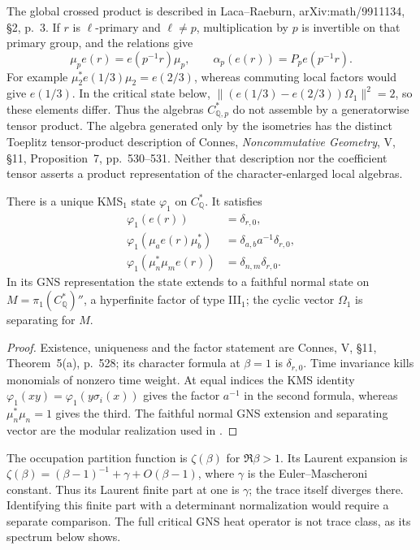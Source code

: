 \begin{remark}
\label{v4-arith:w5-b:rem:wave4-ref}
The global crossed product is described in Laca--Raeburn,
arXiv:math/9911134, \S2, p.~3. If $r$ is $\ell$-primary and
$\ell\ne p$, multiplication by $p$ is invertible on that primary
group, and the relations give
\[
 \mu_p e(r)=e(p^{-1}r)\mu_p,\qquad
 \alpha_p(e(r))=P_p e(p^{-1}r).
\]
For example $\mu_2^*e(1/3)\mu_2=e(2/3)$, whereas commuting local
factors would give $e(1/3)$. In the critical state below,
$\|(e(1/3)-e(2/3))\Omega_1\|^2=2$, so these elements differ.
Thus the algebras $C^*_{\mathbb Q,p}$ do not assemble by a
generatorwise tensor product. The algebra generated only by the
isometries has the distinct Toeplitz tensor-product description of
Connes, \emph{Noncommutative Geometry}, V, \S11, Proposition~7,
pp.~530--531. Neither that description nor the coefficient tensor
asserts a product representation of the character-enlarged local
algebras.
\end{remark}

\begin{lemma}
\label{v4-arith:w5-b:lem:kms-1}
There is a unique KMS$_1$ state $\varphi_1$ on $C^*_{\mathbb Q}$.
It satisfies
\[
 \begin{aligned}
 \varphi_1(e(r))&=\delta_{r,0},\\
 \varphi_1(\mu_a e(r)\mu_b^*)&=\delta_{a,b}a^{-1}\delta_{r,0},\\
 \varphi_1(\mu_n^*\mu_m e(r))&=\delta_{n,m}\delta_{r,0}.
 \end{aligned}
\]
In its GNS representation the state extends to a faithful normal state
on $M=\pi_1(C^*_{\mathbb Q})''$, a hyperfinite factor of type III$_1$;
the cyclic vector $\Omega_1$ is separating for $M$.
\end{lemma}
\begin{proof}
Existence, uniqueness and the factor statement are Connes, V, \S11,
Theorem~5(a), p.~528; its character formula at $\beta=1$ is
$\delta_{r,0}$. Time invariance kills monomials of nonzero time
weight. At equal indices the KMS identity
$\varphi_1(xy)=\varphi_1(y\sigma_i(x))$ gives the factor $a^{-1}$
in the second formula, whereas $\mu_n^*\mu_n=1$ gives the third.
The faithful normal GNS extension and separating vector are the
modular realization used in
.
\end{proof}

\begin{remark}
\label{v4-arith:w5-b:rem:partition-at-one}
The occupation partition function is $\zeta(\beta)$ for $\Re\beta>1$.
Its Laurent expansion is
$\zeta(\beta)=(\beta-1)^{-1}+\gamma+O(\beta-1)$, where $\gamma$
is the Euler--Mascheroni constant. Thus its Laurent finite part at
one is $\gamma$; the trace itself diverges there. Identifying this
finite part with a determinant normalization would require a
separate comparison. The full critical GNS heat operator is not
trace class, as its spectrum below shows.
\end{remark}

